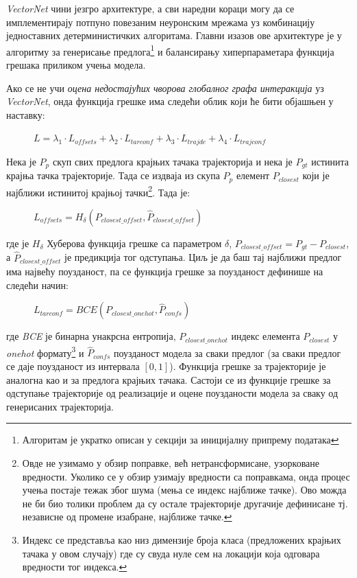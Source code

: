 \documentclass[11pt,oneside]{memoir}
\begin{document}
\textit{VectorNet} чини језгро архитектуре, а сви наредни кораци могу да се имплементирају потпуно повезаним неуронским мрежама уз комбинацију
једноставних детерминистичких алгоритама. Главни изазов ове архитектуре је у алгоритму за генерисање 
предлога\footnote{Алгоритам је укратко описан у секцији за иницијалну припрему података} и балансирању
хиперпараметара функција грешака приликом учења модела.

Ако се не учи \textit{оцена недостајућих чворова глобалног графа интеракција} уз \textit{VectorNet},
онда функција грешке има следећи облик који ће бити објашњен у наставку:

\begin{figure}[H]
  \centering
  $L = \lambda_{1} \cdot L_{offsets} + \lambda_{2} \cdot L_{tarconf} + \lambda_{3} \cdot L_{trajde} + \lambda_{4} \cdot L_{trajconf}$
\end{figure}

Нека је $P_{p}$ скуп свих предлога крајњих тачака трајекторија и нека је $P_{gt}$ истинита крајња тачка трајекторије. Тада се издваја
из скупа $P_{p}$ елемент $P_{closest}$ који је најближи истинитој крајњој тачки\footnote{Овде не узимамо у обзир поправке,
већ нетрансформисане, узорковане вредности. 
Уколико се у обзир узимају вредности са поправкама, онда процес учења постаје тежак због шума (мења се индекс најближе тачке). Ово можда не би био
толики проблем да су остале трајекторије другачије дефинисане тј. независне од промене изабране, најближе тачке.}. 
Тада је:

\begin{figure}[H]
  \centering
  $L_{offsets} = H_{\delta}(P_{closest\_offset}, \hat{P}_{closest\_offset})$
\end{figure}

\noindent где је $H_{\delta}$ Хуберова функција грешке са параметром $\delta$, $P_{closest\_offset} = P_{gt} - P_{closest}$,
а $\hat{P}_{closest\_offset}$ је предикција тог одступања. Циљ је да баш тај најближи предлог има највећу поузданост, па се функција грешке за 
поузданост дефинише на следећи начин:

\begin{figure}[H]
  \centering
  $L_{tarconf} = BCE(P_{closest\_onehot}, \hat{P}_{confs})$
\end{figure}

\noindent где \textit{BCE} је бинарна унакрсна ентропија, $P_{closest\_onehot}$ индекс елемента $P_{closest}$ у \textit{onehot} 
формату\footnote{Индекс се представља као низ димензије броја класа (предложених крајњих тачака у овом случају) где су свуда нуле сем на локацији која одговара
вредности тог индекса.} и $\hat{P}_{confs}$ поузданост модела за сваки предлог (за сваки предлог се даје поузданост из интервала $[0, 1]$). Функција грешке за
трајекторије је аналогна као и за предлога крајњих тачака. Састоји се из функције грешке за одступање трајекторије од реализације и оцене
поузданости модела за сваку од генерисаних трајекторија.
\end{document}
